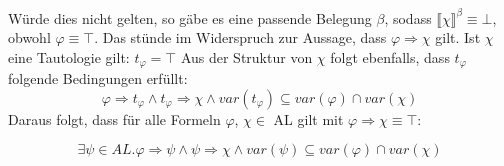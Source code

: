 \documentclass[a4paper,10pt]{article}
\begin{document}
	Würde dies nicht gelten, so gäbe es eine passende Belegung $\beta$, sodass $\llbracket \chi \rrbracket ^\beta \equiv \bot$, obwohl $\varphi \equiv \top$. Das stünde im Widerspruch zur Aussage, dass $\varphi \Rightarrow \chi$ gilt. Ist $\chi$ eine Tautologie gilt: $t_{\varphi} = \top$ 
	Aus der Struktur von $\chi$ folgt ebenfalls, dass $t_{\varphi}$ folgende Bedingungen erfüllt:
	$$\varphi \Rightarrow t_{\varphi} \wedge t_{\varphi} \Rightarrow \chi \wedge var(t_{\varphi}) \subseteq 		  	var(\varphi) \cap var(\chi) $$
	Daraus folgt, dass für alle Formeln $\varphi$, $\chi \in$ AL gilt mit $\varphi \Rightarrow \chi \equiv \top$:
	
	$$\exists \psi \in AL. \varphi \Rightarrow \psi \wedge 
	\psi \Rightarrow \chi \wedge var(\psi) \subseteq var(\varphi) \cap var(\chi)$$
\end{document}
